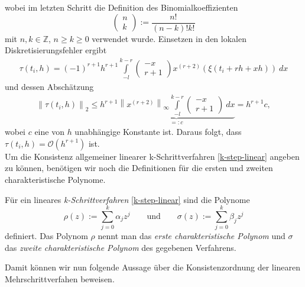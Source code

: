 wobei im letzten Schritt die Definition des Binomialkoeffizienten
\[
    \begin{pmatrix} n \\ k  \end{pmatrix} := \frac{n!}{(n-k)!k!}
\]
mit $n,k \in \mathbb{Z}$, $n\geq k \geq 0$ verwendet wurde. Einsetzen in den lokalen Diskretisierungsfehler ergibt
\begin{align*}
    \tau(t_i,h) = (-1)^{r+1} h^{r+1} \int\limits_{-l}^{k-r} \begin{pmatrix} -x \\ r+1 \end{pmatrix}
    x^{(r+2)}(\xi(t_i+rh+xh))\ dx
\end{align*}
und dessen Abschätzung
\begin{align*}
    \left\lVert \tau(t_i,h) \right\rVert_2 \leq h^{r+1}
    \underbrace{
        \left\lVert x^{(r+2)}\right\rVert_{\infty}\int\limits_{-l}^{k-r} \begin{pmatrix} -x \\ r+1 \end{pmatrix}\ dx
    }_{=:c} = h^{r+1}c,
\end{align*}
wobei $c$ eine von $h$ unabhängige Konstante ist. Daraus folgt, dass $\tau(t_i, h)=\mathcal{O}(h^{r+1})$ ist. \qedwhite\\
Um die Konsistenz allgemeiner linearer k-Schrittverfahren \eqref{k-step-linear} angeben zu können, benötigen wir noch
die Definitionen für die ersten und zweiten charakteristische Polynome.
\begin{definition}
    Für ein lineares \textit{k-Schrittverfahren} \eqref{k-step-linear} sind die Polynome
    \[
        \rho(z) := \sum_{j=0}^{k} \alpha_j z^j \qquad \text{und} \qquad \sigma(z) := \sum_{j=0}^{k} \beta_j z^j
    \]
    definiert. Das Polynom $\rho$ nennt man das {\em erste charakteristische Polynom} und $\sigma$ das
    {\em zweite charakteristische Polynom} des gegebenen Verfahrens.
\end{definition}
Damit können wir nun folgende Aussage über die Konsistenzordnung der linearen Mehrschrittverfahen beweisen.
